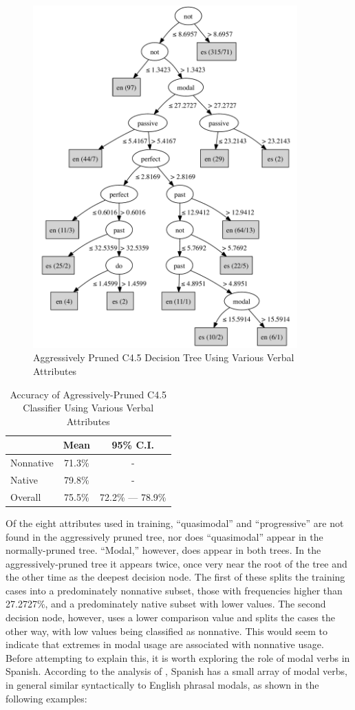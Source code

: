 \documentclass[main.tex]{subfiles}
\begin{document}
\begin{figure}[htbp]
\centering
\includegraphics[width=4in]{pruned-basic-verb-tree.pdf}
\caption{Aggressively Pruned C4.5 Decision Tree Using Various Verbal Attributes}
\label{fig:pruned-basic-verb-tree}
\end{figure}
\begin{table}[htbp]
\centering
\caption{Accuracy of Agressively-Pruned C4.5 Classifier Using Various Verbal Attributes}
\begin{tabular}{l c c}
\toprule
& Mean & 95\% C.I.\\
\midrule
Nonnative & 71.3\% & - \\
Native & 79.8\% & - \\
Overall & 75.5\% & 72.2\% --- 78.9\% \\
\bottomrule
\end{tabular}
\label{table:pruned-basic-verb-results}
\end{table}
Of the eight attributes used in training, ``quasimodal'' and ``progressive'' are not found in the aggressively pruned tree, nor does ``quasimodal'' appear in the normally-pruned tree. ``Modal,'' however, does appear in both trees. In the aggressively-pruned tree it appears twice, once very near the root of the tree and the other time as the deepest decision node. The first of these splits the training cases into a predominately nonnative subset, those with frequencies higher than 27.2727\%, and a predominately native subset with lower values. The second decision node, however, uses a lower comparison value and splits the cases the other way, with low values being classified as nonnative. This would seem to indicate that extremes in modal usage are associated with nonnative usage. Before attempting to explain this, it is worth exploring the role of modal verbs in Spanish. According to the analysis of \citet{butt}, Spanish has a small array of modal verbs, in general similar syntactically to English phrasal modals, as shown in the following examples:
\end{document}
